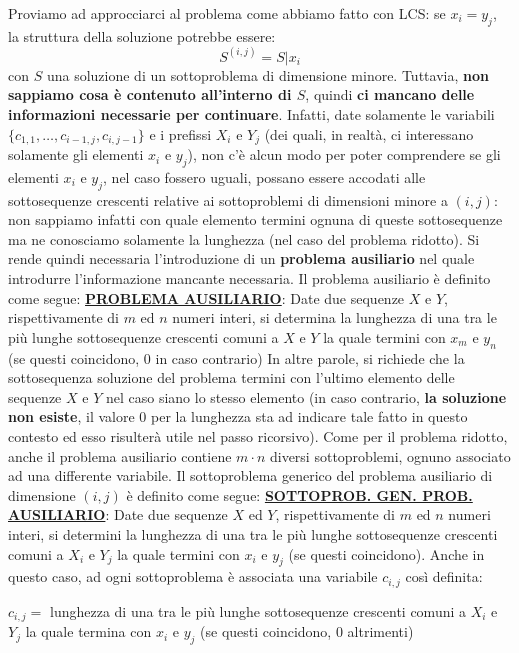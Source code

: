 \documentclass[12pt]{article}
\begin{document}
Proviamo ad approcciarci al problema come abbiamo fatto con LCS: se $x_i = y_j$, la struttura della soluzione potrebbe essere:
$$S^{(i,j)} = S|x_i$$
con $S$ una soluzione di un sottoproblema di dimensione minore. Tuttavia, \textbf{non sappiamo cosa è contenuto all'interno di $S$}, quindi \textbf{ci mancano delle informazioni necessarie per continuare}.
Infatti, date solamente le variabili $\{c_{1,1}, \dots, c_{i-1, j}, c_{i, j-1}\}$ e i prefissi $X_i$ e $Y_j$ (dei quali, in realtà, ci interessano solamente gli elementi $x_i$ e $y_j$), non c'è alcun modo per poter comprendere
se gli elementi $x_i$ e $y_j$, nel caso fossero uguali, possano essere accodati alle sottosequenze crescenti relative ai sottoproblemi di dimensioni minore a $(i,j)$: non sappiamo infatti con quale elemento termini ognuna di queste sottosequenze ma ne conosciamo
solamente la lunghezza (nel caso del problema ridotto). Si rende quindi necessaria l'introduzione di un \textbf{problema ausiliario} nel quale introdurre l'informazione mancante necessaria.
Il problema ausiliario è definito come segue: \newline
\textbf{\underline{PROBLEMA AUSILIARIO}}: Date due sequenze $X$ e $Y$, rispettivamente di $m$ ed $n$ numeri interi, si determina la lunghezza di una tra le più lunghe sottosequenze crescenti comuni a $X$ e $Y$ la quale termini
con $x_m$ e $y_n$ (se questi coincidono, 0 in caso contrario) \newline \newline
In altre parole, si richiede che la sottosequenza soluzione del problema termini con l'ultimo elemento delle sequenze $X$ e $Y$ nel caso siano lo stesso elemento (in caso contrario, \textbf{la soluzione non esiste}, il valore 0 per la lunghezza sta ad indicare tale fatto in questo contesto ed esso risulterà utile nel passo ricorsivo).
Come per il problema ridotto, anche il problema ausiliario contiene $m \cdot n$ diversi sottoproblemi, ognuno associato ad una differente variabile. Il sottoproblema generico del problema ausiliario di dimensione $(i,j)$ è definito come segue: \newline
\textbf{\underline{SOTTOPROB. GEN. PROB. AUSILIARIO}}: Date due sequenze $X$ ed $Y$, rispettivamente di $m$ ed $n$ numeri interi, si determini la lunghezza di una tra le più lunghe sottosequenze crescenti comuni a $X_i$ e $Y_j$ la quale termini con $x_i$ e $y_j$ (se questi coincidono). \newline
Anche in questo caso, ad ogni sottoproblema è associata una variabile $c_{i,j}$ così definita:
\begin{center}
    $c_{i,j} =$ lunghezza di una tra le più lunghe sottosequenze crescenti comuni a $X_i$ e $Y_j$ la quale termina con $x_i$ e $y_j$ (se questi coincidono, 0 altrimenti)
\end{center}
\end{document}
